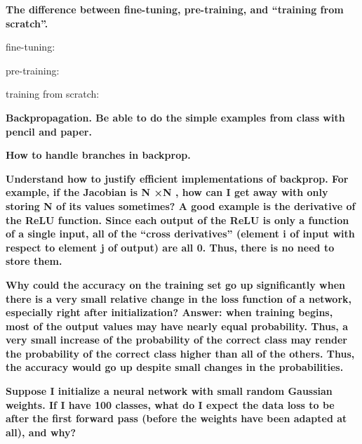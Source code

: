 \documentclass[10pt,letterpaper]{article}
\begin{document}
\subitem \textbf{ The difference between fine-tuning, pre-training, and “training from scratch”.}
\begin{solution}
fine-tuning:

\par
pre-training:

\par
training from scratch:
\end{solution}


\subitem \textbf{ Backpropagation. Be able to do the simple examples from class with pencil and paper.}
\begin{solution}
\end{solution}

\subitem \textbf{ How to handle branches in backprop.}
\begin{solution}
\end{solution}

\subitem \textbf{ Understand how to justify efficient implementations of backprop. For example, if the Jacobian is N ×N , how can I get away with only storing N of its values sometimes? A good example is the derivative of the ReLU function. Since each output of the ReLU is only a function of a single input, all of the “cross derivatives” (element i of input with respect to element j of output) are all 0. Thus, there is no need to store them.}
\begin{solution}
\end{solution}

\subitem \textbf{ Why could the accuracy on the training set go up significantly when there is a very small relative change in the loss function of a network, especially right after initialization? 
\subsubitem Answer: when training begins, most of the output values may have nearly equal probability. Thus, a very small increase of the probability of the correct class may render the probability of the correct class higher than all of the others. Thus, the accuracy would go up despite small changes in the probabilities.}
\begin{solution}
\end{solution}

\subitem \textbf{ Suppose I initialize a neural network with small random Gaussian weights. If I have 100 classes, what do I expect the data loss to be after the first forward pass (before the weights have been adapted at all), and why?}
\begin{solution}
\end{solution}
\end{document}
